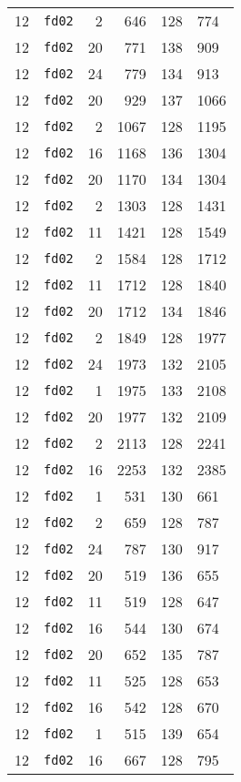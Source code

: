 \documentclass{article}
\begin{document}
\begin{table}[h!]
\begin{tabular}{llrrrl}
    12 & \texttt{fd02} & 2 & 646 & 128 & 774 \\
    12 & \texttt{fd02} & 20 & 771 & 138 & 909 \\
    12 & \texttt{fd02} & 24 & 779 & 134 & 913 \\
    12 & \texttt{fd02} & 20 & 929 & 137 & 1066 \\
    12 & \texttt{fd02} & 2 & 1067 & 128 & 1195 \\
    12 & \texttt{fd02} & 16 & 1168 & 136 & 1304 \\
    12 & \texttt{fd02} & 20 & 1170 & 134 & 1304 \\
    12 & \texttt{fd02} & 2 & 1303 & 128 & 1431 \\
    12 & \texttt{fd02} & 11 & 1421 & 128 & 1549 \\
    12 & \texttt{fd02} & 2 & 1584 & 128 & 1712 \\
    12 & \texttt{fd02} & 11 & 1712 & 128 & 1840 \\
    12 & \texttt{fd02} & 20 & 1712 & 134 & 1846 \\
    12 & \texttt{fd02} & 2 & 1849 & 128 & 1977 \\
    12 & \texttt{fd02} & 24 & 1973 & 132 & 2105 \\
    12 & \texttt{fd02} & 1 & 1975 & 133 & 2108 \\
    12 & \texttt{fd02} & 20 & 1977 & 132 & 2109 \\
    12 & \texttt{fd02} & 2 & 2113 & 128 & 2241 \\
    12 & \texttt{fd02} & 16 & 2253 & 132 & 2385 \\
    12 & \texttt{fd02} & 1 & 531 & 130 & 661 \\
    12 & \texttt{fd02} & 2 & 659 & 128 & 787 \\
    12 & \texttt{fd02} & 24 & 787 & 130 & 917 \\
    12 & \texttt{fd02} & 20 & 519 & 136 & 655 \\
    12 & \texttt{fd02} & 11 & 519 & 128 & 647 \\
    12 & \texttt{fd02} & 16 & 544 & 130 & 674 \\
    12 & \texttt{fd02} & 20 & 652 & 135 & 787 \\
    12 & \texttt{fd02} & 11 & 525 & 128 & 653 \\
    12 & \texttt{fd02} & 16 & 542 & 128 & 670 \\
    12 & \texttt{fd02} & 1 & 515 & 139 & 654 \\
    12 & \texttt{fd02} & 16 & 667 & 128 & 795 \\

\end{tabular}
\end{table}
\end{document}
